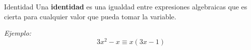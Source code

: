 \begin{infocard}{Identidad}
    Una \textbf{identidad} es una igualdad entre expresiones algebraicas que es cierta para cualquier valor que pueda tomar la variable.

    \emph{Ejemplo:}\[3x^2-x \equiv x\left(3x-1\right)\]
\end{infocard}